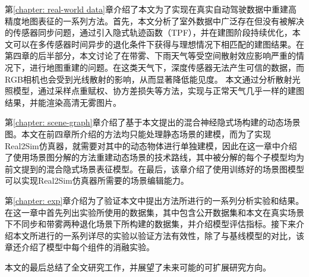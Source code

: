 第\ref{chapter: real-world data}章介绍了本文为了实现在真实自动驾驶数据中重建高精度地图表征的一系列方法。首先，本文分析了室外数据中广泛存在但没有被解决的传感器同步问题，通过引入隐式轨迹函数（TPF），并在建图阶段持续优化，本文可以在多传感器时间异步的退化条件下获得与理想情况下相匹配的建图结果。在第四章的后半部分，本文讨论了在带雾、下雨天气等受空间散射效应影响严重的情况下，进行地图重建的问题。在这类天气下，深度传感器无法产生可信的数据，而RGB相机也会受到光线散射的影响，从而显著降低能见度。 本文通过分析散射光照模型，通过采样点重赋权、协方差损失等方法，实现与正常天气几乎一样的建图结果，并能渲染高清无雾图片。

第\ref{chapter: scene-graph}章介绍了基于本文提出的混合神经隐式场构建的动态场景图。本文在前四章所介绍的方法均只能处理静态场景的建模，而为了实现Real2Sim仿真器，就需要对其中的动态物体进行单独建模，因此在这一章中介绍了使用场景图分解的方法重建动态场景的技术路线，其中被分解的每个子模型均为前文提到的混合隐式场景表征模型。在最后，该章介绍了使用训练好的场景图模型可以实现Real2Sim仿真器所需要的场景编辑能力。

第\ref{chapter: exp}章介绍为了验证本文中提出方法所进行的一系列分析实验和结果。在这一章中首先列出实验所使用的数据集，其中包含公开数据集和本文在真实场景下不同步和带雾两种退化场景下所构建的数据集，并介绍模型评估指标。接下来介绍本文所进行的一系列详尽的实验以验证方法有效性，除了与基线模型的对比，该章还介绍了模型中每个组件的消融实验。

本文的最后总结了全文研究工作，并展望了未来可能的可扩展研究方向。